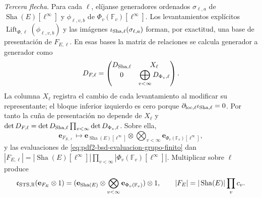 \begin{proposition}
\emph{Tercera flecha.} Para cada $\ell$, elíjanse generadores ordenados
$\sigma_{\ell,a}$ de $\operatorname{Sha}(E)[\ell^\infty]$ y
$\phi_{\ell,v,b}$ de $\Phi_v(\mathbb F_v)[\ell^\infty]$. Los levantamientos explícitos
$\operatorname{Lift}_{\Phi,\ell}(\phi_{\ell,v,b})$ y las imágenes
$\iota_{{\rm Sha},\ell}(\sigma_{\ell,a})$ forman, por exactitud, una base de
presentación de $F_{E,\ell}$. En esas bases la matriz de relaciones se
calcula generador a generador como
\begin{equation}\label{eq:pdf2-bsd-c3-matriz-presentacion}
 D_{F,\ell}=
 \begin{pmatrix}
  D_{{\rm Sha},\ell}&X_\ell\\
  0&\displaystyle\bigoplus_{v<\infty}D_{\Phi_v,\ell}
 \end{pmatrix}.
\end{equation}
La columna $X_\ell$ registra el cambio de cada levantamiento al modificar su
representante; el bloque inferior izquierdo es cero porque
$\partial_{{\rm loc},\ell}\iota_{{\rm Sha},\ell}=0$. Por tanto la cuña de
presentación no depende de $X_\ell$ y
$\det D_{F,\ell}=\det D_{{\rm Sha},\ell}
\prod_{v<\infty}\det D_{\Phi_v,\ell}$. Sobre ella,
\begin{equation}\label{eq:pdf2-bsd-c3-generadores}
 \mathbf e_{F_{E,\ell}}
 \longmapsto
 \mathbf e_{\operatorname{Sha}(E)[\ell^\infty]}
 \otimes\bigotimes_{v<\infty}
    \mathbf e_{\Phi_v(\mathbb F_v)[\ell^\infty]},
\end{equation}
y las evaluaciones de \eqref{eq:pdf2-bsd-evaluacion-grupo-finito} dan
$|F_{E,\ell}|=|\operatorname{Sha}(E)[\ell^\infty]|
\prod_{v<\infty}|\Phi_v(\mathbb F_v)[\ell^\infty]|$.
Multiplicar sobre $\ell$ produce
\begin{equation}\label{eq:pdf2-bsd-c3-integral-generadores}
 \mathfrak c_{{\rm STS},\mathbb R}(\mathbf e_{F_E}\otimes1)
 =(\mathbf e_{\operatorname{Sha}(E)}
  \otimes\bigotimes_{v<\infty}\mathbf e_{\Phi_v(\mathbb F_v)})\otimes1,
 \qquad
 |F_E|=|\operatorname{Sha}(E)|\prod_vc_v.
\end{equation}


\end{proposition}
